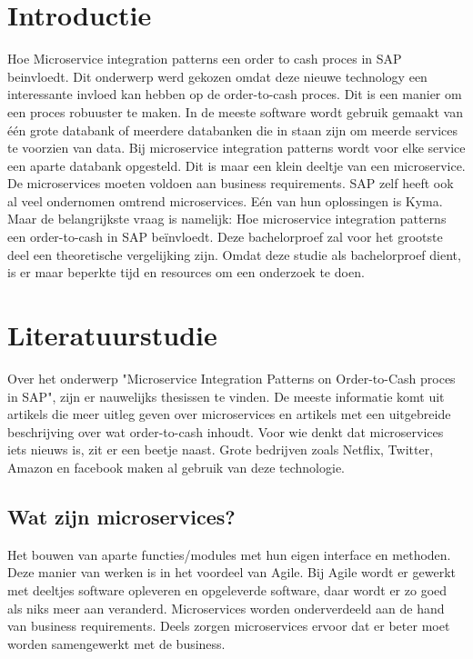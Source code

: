 
\section{Introductie} %
\label{sec:introductie}

Hoe Microservice integration patterns een order to cash proces in SAP beinvloedt. Dit onderwerp werd gekozen omdat deze nieuwe technology een interessante invloed kan hebben op de order-to-cash proces. Dit is een manier om een proces robuuster te maken. In de meeste software wordt gebruik gemaakt van één grote databank of meerdere databanken die in staan zijn om meerde services te voorzien van data. Bij microservice integration patterns wordt voor elke service een aparte databank opgesteld. Dit is maar een klein deeltje van een microservice. De microservices moeten voldoen aan business requirements. SAP zelf heeft ook al veel ondernomen omtrend microservices. Eén van hun oplossingen is Kyma. Maar de belangrijkste vraag is namelijk: Hoe microservice integration patterns een order-to-cash in SAP beïnvloedt. Deze bachelorproef zal voor het grootste deel een theoretische vergelijking zijn. Omdat deze studie als bachelorproef dient, is er maar beperkte tijd en resources om een onderzoek te doen. 


\section{Literatuurstudie}
\label{sec:state-of-the-art}

Over het onderwerp "Microservice Integration Patterns on Order-to-Cash proces in SAP", zijn er nauwelijks thesissen te vinden. De meeste informatie komt uit artikels die meer uitleg geven over microservices en artikels met een uitgebreide beschrijving over wat order-to-cash inhoudt.
Voor wie denkt dat microservices iets nieuws is, zit er een beetje naast. Grote bedrijven zoals Netflix, Twitter, Amazon en facebook maken al gebruik van deze technologie. ~\cite{CiderBlog2018}

\subsection{Wat zijn microservices?}
Het bouwen van aparte functies/modules met hun eigen interface en methoden. Deze manier van werken is in het voordeel van Agile. Bij Agile wordt er gewerkt met deeltjes software opleveren en opgeleverde software, daar wordt er zo goed als niks meer aan veranderd. Microservices worden onderverdeeld aan de hand van business requirements. Deels zorgen microservices ervoor dat er beter moet worden samengewerkt met de business.

